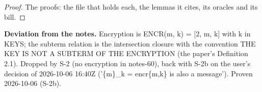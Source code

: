 \begin{prop}\label{thm:subterm-encr-other-key}
%
%
\end{prop}
%
\begin{proof}
%
The proofs: the file that holds each, the lemmas it cites, its oracles and its bill.
%
%
%
%
\end{proof}
%
\noindent\textbf{Deviation from the notes.} Encryption is ENCR(m, k) = [2, m, k] with k in KEYS; the subterm relation is the intersection closure with the convention THE KEY IS NOT A SUBTERM OF THE ENCRYPTION (the paper's Definition 2.1). Dropped by S-2 (no encryption in notes-60), back with S-2b on the user's decision of 2026-10-06 16:40Z ('\{m\}\_k = encr\{m,k\} is also a message'). Proven 2026-10-06 (S-2b).
%
\renewcommand{\thethm}{3.3}
